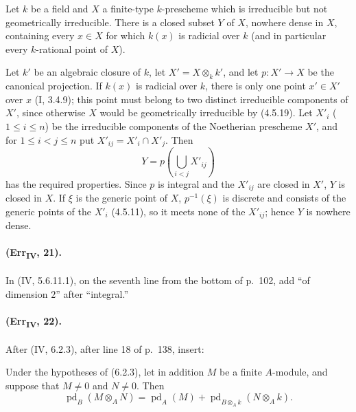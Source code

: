 \begin{corollary}[4.5.19.3]
Let $k$ be a field and $X$ a finite-type $k$-prescheme which is
irreducible but not geometrically irreducible.  There is a closed subset
$Y$ of $X$, nowhere dense in $X$, containing every $x\in X$ for which
$k(x)$ is radicial over $k$ (and in particular every $k$-rational point
of $X$).
\end{corollary}

Let $k'$ be an algebraic closure of $k$, let $X'=X\otimes_kk'$, and let
$p:X'\to X$ be the canonical projection.  If $k(x)$ is radicial over
$k$, there is only one point $x'\in X'$ over $x$ (I, 3.4.9); this point
must belong to two distinct irreducible components of $X'$, since
otherwise $X$ would be geometrically irreducible by (4.5.19).  Let
$X'_i$ ($1\leq i\leq n$) be the irreducible components of the Noetherian
prescheme $X'$, and for $1\leq i<j\leq n$ put
$X'_{ij}=X'_i\cap X'_j$.  Then
\[
 Y=p\left(\bigcup_{i<j}X'_{ij}\right)
\]
has the required properties.  Since $p$ is integral and the $X'_{ij}$
are closed in $X'$, $Y$ is closed in $X$.  If $\xi$ is the generic point
of $X$, $p^{-1}(\xi)$ is discrete and consists of the generic points of
the $X'_i$ (4.5.11), so it meets none of the $X'_{ij}$; hence $Y$ is
nowhere dense.

\paragraph{(Err\textsubscript{IV}, 21).}
In (IV, 5.6.11.1), on the seventh line from the bottom of p.~102, add
``of dimension $2$'' after ``integral.''

\paragraph{(Err\textsubscript{IV}, 22).}
After (IV, 6.2.3), after line 18 of p.~138, insert:

\begin{proposition}[6.2.4]
Under the hypotheses of (6.2.3), let in addition $M$ be a finite
$A$-module, and suppose that $M\neq0$ and $N\neq0$.  Then
\begin{equation}
 \operatorname{pd}_B(M\otimes_AN)=
 \operatorname{pd}_A(M)+
 \operatorname{pd}_{B\otimes_Ak}(N\otimes_Ak). \tag{6.2.4.1}
\end{equation}
\end{proposition}

